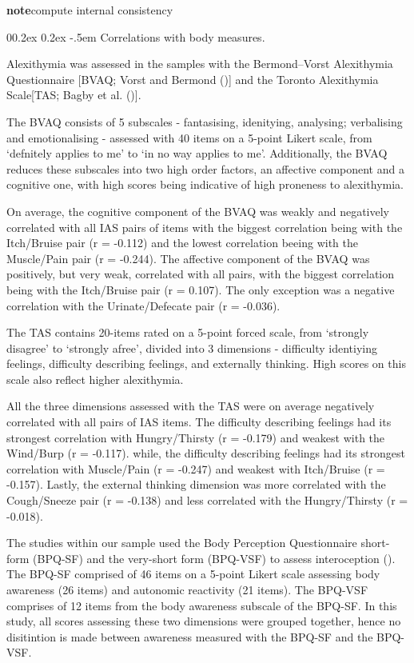 \documentclass[
  man,
  floatsintext,
  longtable,
  nolmodern,
  notxfonts,
  notimes,
  colorlinks=true,linkcolor=blue,citecolor=blue,urlcolor=blue]{apa7}
\makeatletter
\renewcommand{\paragraph}{\@startsection{paragraph}{4}{\parindent}%
	{0\baselineskip \@plus 0.2ex \@minus 0.2ex}%
	{-.5em}%
	{\normalfont\normalsize\bfseries\typesectitle}}
\makeatother
\begin{document}
\textbf{note}compute internal consistency

\paragraph{Correlations with body
measures.}\label{correlations-with-body-measures}

Alexithymia was assessed in the samples with the Bermond--Vorst
Alexithymia Questionnaire {[}BVAQ; Vorst and Bermond
(){]} and the Toronto Alexithymia
Scale{[}TAS; Bagby et al. (){]}.

The BVAQ consists of 5 subscales - fantasising, idenitying, analysing;
verbalising and emotionalising - assessed with 40 items on a 5-point
Likert scale, from `defnitely applies to me' to `in no way applies to
me'. Additionally, the BVAQ reduces these subscales into two high order
factors, an affective component and a cognitive one, with high scores
being indicative of high proneness to alexithymia.

On average, the cognitive component of the BVAQ was weakly and
negatively correlated with all IAS pairs of items with the biggest
correlation being with the Itch/Bruise pair (r = -0.112) and the lowest
correlation beeing with the Muscle/Pain pair (r = -0.244). The affective
component of the BVAQ was positively, but very weak, correlated with all
pairs, with the biggest correlation being with the Itch/Bruise pair (r =
0.107). The only exception was a negative correlation with the
Urinate/Defecate pair (r = -0.036).

The TAS contains 20-items rated on a 5-point forced scale, from
`strongly disagree' to `strongly afree', divided into 3 dimensions -
difficulty identiying feelings, difficulty describing feelings, and
externally thinking. High scores on this scale also reflect higher
alexithymia.

All the three dimensions assessed with the TAS were on average
negatively correlated with all pairs of IAS items. The difficulty
describing feelings had its strongest correlation with Hungry/Thirsty (r
= -0.179) and weakest with the Wind/Burp (r = -0.117). while, the
difficulty describing feelings had its strongest correlation with
Muscle/Pain (r = -0.247) and weakest with Itch/Bruise (r = -0.157).
Lastly, the external thinking dimension was more correlated with the
Cough/Sneeze pair (r = -0.138) and less correlated with the
Hungry/Thirsty (r = -0.018).

The studies within our sample used the Body Perception Questionnaire
short-form (BPQ-SF) and the very-short form (BPQ-VSF) to assess
interoception (). The BPQ-SF comprised of 46 items on a 5-point Likert scale
assessing body awareness (26 items) and autonomic reactivity (21 items).
The BPQ-VSF comprises of 12 items from the body awareness subscale of
the BPQ-SF. In this study, all scores assessing these two dimensions
were grouped together, hence no disitintion is made between awareness
measured with the BPQ-SF and the BPQ-VSF.
\end{document}
